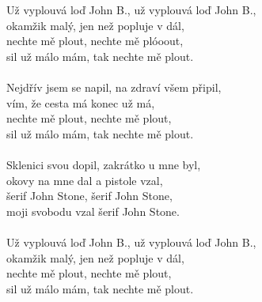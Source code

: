 
Už vyplouvá loď John B., už vyplouvá loď John B.,\\
okamžik malý, jen než popluje v dál,\\
nechte mě plout, nechte mě plóoout,\\
sil už málo mám, tak nechte mě plout.\\
\\
Nejdřív jsem se napil, na zdraví všem připil,\\
vím, že cesta má konec už má,\\
nechte mě plout, nechte mě plout,\\
sil už málo mám, tak nechte mě plout.\\
\\
Sklenici svou dopil, zakrátko u mne byl,\\
okovy na mne dal a pistole vzal,\\
šerif John Stone, šerif John Stone,\\
moji svobodu vzal šerif John Stone.\\
\\
Už vyplouvá loď John B., už vyplouvá loď John B.,\\
okamžik malý, jen než popluje v dál,\\
nechte mě plout, nechte mě plout,\\
sil už málo mám, tak nechte mě plout.

\newpage
